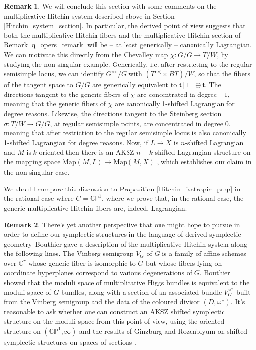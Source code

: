 \documentclass[11pt, oneside, reqno]{amsart}
\theoremstyle{definition} \newtheorem{definition}{Definition}[section]
\theoremstyle{definition} \newtheorem{remark}[definition]{Remark}
\theoremstyle{definition} \newtheorem{remarks}[definition]{Remarks}
\theoremstyle{definition} \newtheorem{question}[definition]{Question}
\theoremstyle{definition} \newtheorem*{note}{Note}
\theoremstyle{definition} \newtheorem{example}[definition]{Example}
\theoremstyle{definition} \newtheorem{examples}[definition]{Examples}
\newcommand{\bb}[1]{\mathbb{#1}}
\newcommand{\mr}[1]{\mathrm{#1}}
\newcommand{\mf}[1]{\mathfrak{#1}}
\newcommand{\ul}[1]{\underline{#1}}
\newcommand{\CC}{\mathbb{C}}
\newcommand{\map}{\ul{\mr{Map}}}
\begin{document}
\begin{remark}
We will conclude this section with some comments on the multiplicative Hitchin system described above in Section \ref{Hitchin_system_section}.  In particular, the derived point of view suggests that both the multiplicative Hitchin fibers and the multiplicative Hitchin section of Remark \ref{q_opers_remark} will be -- at least generically -- canonically Lagrangian.  We can motivate this directly from the Chevalley map $\chi \colon G/G \to T/W$, by studying the non-singular example.  Generically, i.e. after restricting to the regular semisimple locus, we can identify $G^{\mr{rss}}/G$ with $(T^{\mr{reg}} \times BT)/W$, so that the fibers of the tangent space to $G/G$ are generically equivalent to $\mf t[1] \oplus \mf t$.  The directions tangent to the generic fibers of $\chi$ are concentrated in degree $-1$, meaning that the generic fibers of $\chi$ are canonically 1-shifted Lagrangian for degree reasons.  Likewise, the directions tangent to the Steinberg section $\sigma \colon T/W \to G/G$, at regular semisimple points, are concentrated in degree 0, meaning that after restriction to the regular semisimple locus is also canonically 1-shifted Lagrangian for degree reasons.  Now, if $L \to X$ is $n$-shifted Lagrangian and $M$ is $k$-oriented then there is an AKSZ $n-k$-shifted Lagrangian structure on the mapping space $\map(M,L) \to \map(M,X)$ \cite[Theorem 2.10]{Calaque}, which establishes our claim in the non-singular case. 

We should compare this discussion to Proposition \ref{Hitchin_isotropic_prop} in the rational case where $C = \bb{CP}^1$, where we prove that, in the rational case, the generic multiplicative Hitchin fibers are, indeed, Lagrangian.  
\end{remark}

\begin{remark} \label{Bouthier_remark}
There's yet another perspective that one might hope to pursue in order to define our symplectic structures in the language of derived symplectic geometry.  Bouthier \cite{Bouthier2} gave a description of the multiplicative Hitchin system along the following lines.  The Vinberg semigroup $V_G$ of $G$ is a family of affine schemes over $\CC^r$ whose generic fiber is isomorphic to $G$ but whose fibers lying on coordinate hyperplanes correspond to various degenerations of $G$.  Bouthier showed that the moduli space of multiplicative Higgs bundles is equivalent to the moduli space of $G$-bundles, along with a section of an associated bundle $V_G^{\omega^\vee}$ built from the Vinberg semigroup and the data of the coloured divisor $(D,\omega^\vee)$.  It's reasonable to ask whether one can construct an AKSZ shifted symplectic structure on the moduli space from this point of view, using the oriented structure on $(\bb{CP}^1,\infty)$ and the results of Ginzburg and Rozenblyum on shifted symplectic structures on spaces of sections \cite{GinzburgRozenblyum}.  
\end{remark}
\end{document}
